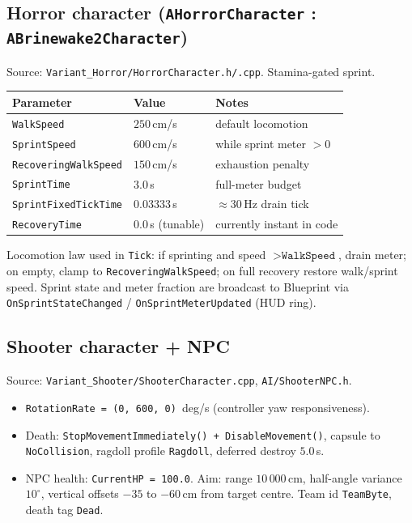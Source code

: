 \documentclass[11pt,a4paper]{article}
\begin{document}
\subsection{Horror character (\texttt{AHorrorCharacter} : \texttt{ABrinewake2Character})}
Source: \texttt{Variant\_Horror/HorrorCharacter.h/.cpp}. Stamina-gated sprint.

\begin{center}
\begin{tabular}{@{}lll@{}}
\toprule
Parameter & Value & Notes \\
\midrule
\texttt{WalkSpeed} & $250$\,cm/s & default locomotion \\
\texttt{SprintSpeed} & $600$\,cm/s & while sprint meter $>0$ \\
\texttt{RecoveringWalkSpeed} & $150$\,cm/s & exhaustion penalty \\
\texttt{SprintTime} & $3.0$\,s & full-meter budget \\
\texttt{SprintFixedTickTime} & $0.03333$\,s & $\approx 30$\,Hz drain tick \\
\texttt{RecoveryTime} & $0.0$\,s (tunable) & currently instant in code \\
\bottomrule
\end{tabular}
\end{center}

Locomotion law used in \texttt{Tick}: if sprinting and speed $> \texttt{WalkSpeed}$, drain meter; on empty, clamp to \texttt{RecoveringWalkSpeed}; on full recovery restore walk/sprint speed. Sprint state and meter fraction are broadcast to Blueprint via \texttt{OnSprintStateChanged} / \texttt{OnSprintMeterUpdated} (HUD ring).

\subsection{Shooter character + NPC}
Source: \texttt{Variant\_Shooter/ShooterCharacter.cpp}, \texttt{AI/ShooterNPC.h}.
\begin{itemize}[leftmargin=1.4em]
  \item \texttt{RotationRate = (0, 600, 0)}~deg/s (controller yaw responsiveness).
  \item Death: \texttt{StopMovementImmediately() + DisableMovement()}, capsule to \texttt{NoCollision}, ragdoll profile \texttt{Ragdoll}, deferred destroy $5.0$\,s.
  \item NPC health: \texttt{CurrentHP = 100.0}. Aim: range $10\,000$\,cm, half-angle variance $10^\circ$, vertical offsets $-35$ to $-60$\,cm from target centre. Team id \texttt{TeamByte}, death tag \texttt{Dead}.
\end{itemize}
\end{document}
